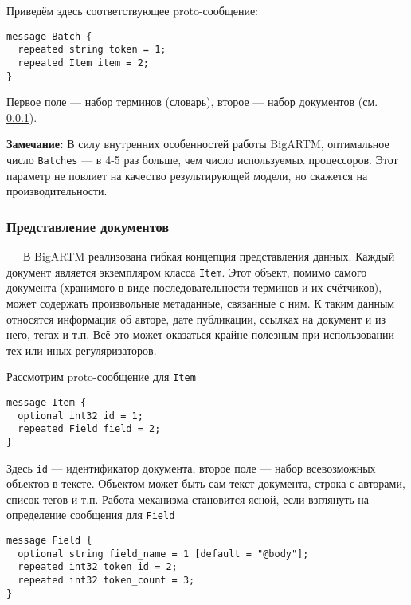 Приведём здесь соответствующее proto-сообщение:

\vspace{4pt}
\noindent
\verb|message Batch {| \\
\verb|  repeated string token = 1;| \\
\verb|  repeated Item item = 2;| \\
\verb|}|
\vspace{4pt}

Первое поле --- набор терминов (словарь), второе --- набор документов (см. \ref{item_label}).

{\bf Замечание:} В силу внутренних особенностей работы BigARTM, оптимальное число \verb|Batches| --- в 4-5 раз больше, чем число используемых процессоров. Этот параметр не повлиет на качество результирующей модели, но скажется на производительности.

\subsubsection{Представление документов}\label{item_label}
 $\quad\;\:$В BigARTM реализована гибкая концепция представления данных. Каждый документ является экземпляром класса \verb'Item'. Этот объект, помимо самого документа (хранимого в виде последовательности терминов и их счётчиков), может содержать произвольные метаданные, связанные с ним. К таким данным относятся информация об авторе, дате публикации, ссылках на документ и из него, тегах и т.п. Всё это может оказаться крайне полезным при использовании тех или иных регуляризаторов.
 
 Рассмотрим proto-сообщение для \verb|Item|
   
 \vspace{4pt}
 \noindent
 \verb|message Item {| \\
 \verb|  optional int32 id = 1;| \\
 \verb|  repeated Field field = 2;| \\
 \verb|}|
 \vspace{4pt} 
 
 Здесь \verb|id| --- идентификатор документа, второе поле --- набор всевозможных объектов в тексте. Объектом может быть сам текст документа, строка с авторами, список тегов и т.п. Работа механизма становится ясной, если взглянуть на определение сообщения для \verb|Field|
 
 \vspace{4pt}
 \noindent
 \verb|message Field {| \\
 \verb|  optional string field_name = 1 [default = "@body"];| \\
 \verb|  repeated int32 token_id = 2;| \\
 \verb|  repeated int32 token_count = 3;| \\
 \verb|}|
 \vspace{4pt} 
 
